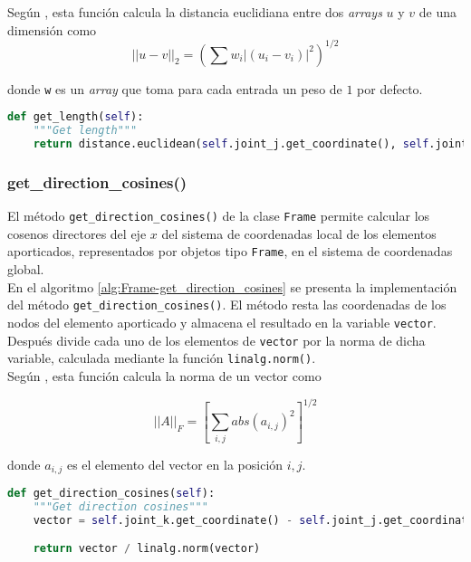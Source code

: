 Según \cite{2020SciPy-NMeth}, esta función calcula la distancia euclidiana entre dos \emph{arrays} $ u $ y $ v $ de una dimensión como
\begin{equation}
  {||u-v||}_2 = \left(\sum{w_i |(u_i - v_i)|^2}\right)^{1/2}
\end{equation}

donde \verb|w| es un \emph{array} que toma para cada entrada un peso de $ 1 $ por defecto.\\ 

\begin{lstlisting}[language=Python,caption=Método \texttt{get\_length()} de la clase \texttt{Frame}.,label=alg:Frame-get_length, frame=single]
def get_length(self):
    """Get length"""
    return distance.euclidean(self.joint_j.get_coordinate(), self.joint_k.get_coordinate())
\end{lstlisting}

\subsubsection{get\_direction\_cosines()}
El método \verb|get_direction_cosines()| de la clase \verb|Frame| permite calcular los cosenos directores del eje $ x $ del sistema de coordenadas local de los elementos aporticados, representados por objetos tipo \verb|Frame|, en el sistema de coordenadas global.\\

En el algoritmo \ref{alg:Frame-get_direction_cosines} se presenta la implementación del método \verb|get_direction_cosines()|. El método resta las coordenadas de los nodos del elemento aporticado y almacena el resultado en la variable \verb|vector|. Después divide cada uno de los elementos de \verb|vector| por la norma de dicha variable, calculada mediante la función \verb|linalg.norm()|.\\

Según \cite{harris2020array}, esta función calcula la norma de un vector como

\begin{equation}
  {||A||}_F = \left[\sum_{i,j} abs(a_{i,j})^2\right]^{1/2}
\end{equation}

donde $ a_{i,j} $ es el elemento del vector en la posición $ i, j $.\\

\begin{lstlisting}[language=Python,caption=Método \texttt{get\_direction\_cosines()} de la clase \texttt{Frame}.,label=alg:Frame-get_direction_cosines, frame=single]
def get_direction_cosines(self):
    """Get direction cosines"""
    vector = self.joint_k.get_coordinate() - self.joint_j.get_coordinate()

    return vector / linalg.norm(vector)
\end{lstlisting}

